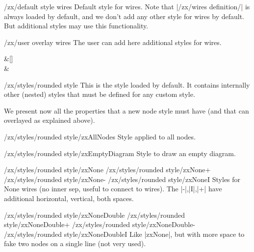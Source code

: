 \documentclass[a4paper]{ltxdoc}
\begin{document}
{\begin{stylekey}{/zx/default style wires}
  Default style for wires. Note that |/zx/wires definition/| is always loaded by default, and we don't add any other style for wires by default. But additional styles may use this functionality.
\end{stylekey}

\begin{stylekey}{/zx/user overlay wires}
  The user can add here additional styles for wires.
\begin{codeexample}[]
\begin{ZX}[/zx/user overlay wires/.style={thick,->,C/.append style={dashed}}]
  \zxNone{} \ar[d,C] \rar[] &[\zxWCol] \zxNone{}\\[\zxWRow]
  \zxNone{} \rar[] & \zxNone{}
\end{ZX}
\end{codeexample}
\end{stylekey}

\begin{stylekey}{/zx/styles/rounded style}
  This is the style loaded by default. It contains internally other (nested) styles that must be defined for any custom style.
\end{stylekey}

We present now all the properties that a new node style must have (and that can overlayed as explained above).
\begin{stylekey}{/zx/styles/rounded style/zxAllNodes}
  Style applied to all nodes.
\end{stylekey}

\begin{stylekey}{/zx/styles/rounded style/zxEmptyDiagram}
  Style to draw an empty diagram.
\end{stylekey}

\begin{pgfmanualentry}
  \makeatletter
  \def\extrakeytext{style, }
  \extractkey/zx/styles/rounded style/zxNone\@nil%
  \extractkey/zx/styles/rounded style/zxNone+\@nil%
  \extractkey/zx/styles/rounded style/zxNone-\@nil%
  \extractkey/zx/styles/rounded style/zxNoneI\@nil%
  \makeatother
  \pgfmanualbody
  Styles for None wires (no inner sep, useful to connect to wires). The |-|,|I|,|+| have additional horizontal, vertical, both spaces.
\end{pgfmanualentry}

\begin{pgfmanualentry}
  \makeatletter
  \def\extrakeytext{style, }
  \extractkey/zx/styles/rounded style/zxNoneDouble\@nil%
  \extractkey/zx/styles/rounded style/zxNoneDouble+\@nil%
  \extractkey/zx/styles/rounded style/zxNoneDouble-\@nil%
  \extractkey/zx/styles/rounded style/zxNoneDoubleI\@nil%
  \makeatother
  \pgfmanualbody
  Like |zxNone|, but with more space to fake two nodes on a single line (not very used).
\end{pgfmanualentry}

}
\end{document}
